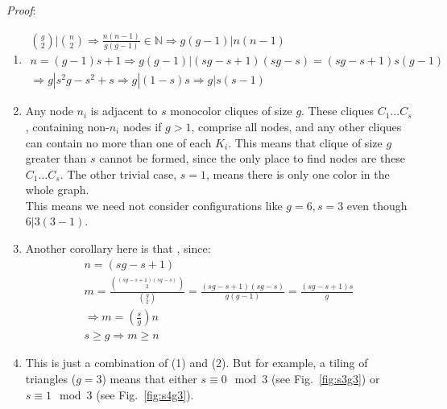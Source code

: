\documentclass[11pt, oneside]{article} 	%
\begin{document}
\emph{Proof}:
\begin{enumerate}
\item 
\begin{align}
{g \choose 2} \bigg| {n \choose 2} \Rightarrow \frac{n(n-1)}{g(g-1)} \in \mathbb{N} \Rightarrow g(g-1) | n(n-1) \\
 n = (g-1)s+1 \Rightarrow g(g-1) \big| (sg-s+1)(sg-s) = (sg-s+1)s(g-1)\\
\Rightarrow g | s^2g - s^2 + s \Rightarrow g | (1-s)s \Rightarrow g | s(s-1) 
\end{align}
\item Any node $n_i$ is adjacent to $s$ monocolor cliques of size $g$. These cliques $C_1 ... C_s$, containing non-$n_i$ nodes if $g > 1$, comprise all nodes, and any other cliques can contain no more than one of each $K_i$. This means that clique of size $g$ greater than $s$ cannot be formed, since the only place to find nodes are these $C_1 ... C_s$. The other trivial case, $s=1$, means there is only one color in the whole graph. 
\\

This means we need not consider configurations like $g = 6, s=3$ even though $6 | 3(3-1)$.

\item Another corollary here is that , since:
\begin{align}
n = (sg - s + 1) \\
m = \frac{{(sg - s + 1)(sg-s) \choose 2}}{{g \choose 2}} = \frac{(sg-s+1)(sg-s)}{g(g-1)} = \frac{(sg-s+1)s}{g} \\
\Rightarrow m = (\frac{s}{g})n\\
s \geq g \Rightarrow m \geq n
\end{align}
\item This is just a combination of (1) and (2). But for example, a tiling of triangles ($g=3$) means that either $s \equiv 0 \mod 3$ (see Fig.~\ref{fig:s3g3})
 or $s \equiv 1 \mod 3$ (see Fig.~\ref{fig:s4g3}). 
\end{enumerate}
\end{document}
